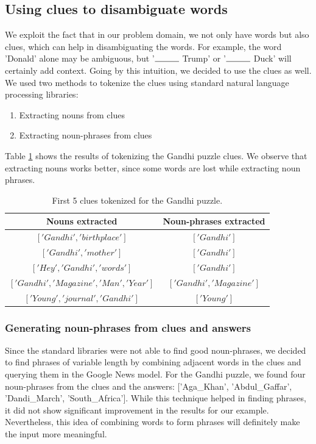 \documentclass[twoside]{article}
\begin{document}
\subsection{Using clues to disambiguate words}
\label{sec:sec3.3}
We exploit the fact that in our problem domain, we not only have words but also clues, which can help in disambiguating the words. For example, the word 'Donald' alone may be ambiguous, but '$\rule{1cm}{0.15mm}$ Trump' or '$\rule{1cm}{0.15mm}$ Duck' will certainly add context. Going by this intuition, we decided to use the clues as well. We used two methods to tokenize the clues using standard natural language processing libraries:
\begin{enumerate}
  \item Extracting nouns from clues
  \item Extracting noun-phrases from clues
\end{enumerate}
Table \ref{tab:table3} shows the results of tokenizing the Gandhi puzzle clues. We observe that extracting nouns works better, since some words are lost while extracting noun phrases. 
\begin{table}[h!]
  \begin{center}
    \begin{tabular}{c c}
      \toprule
      \textbf{Nouns extracted} & \textbf{Noun-phrases extracted}  \\ 
      \midrule
      $['Gandhi', 'birthplace']$ & $['Gandhi']$ \\
      $['Gandhi', 'mother']$ & $['Gandhi']$\\
      $['Hey', 'Gandhi', 'words']$ & $['Gandhi']$\\
      $['Gandhi', 'Magazine', 'Man', 'Year']$ & $['Gandhi', 'Magazine']$\\
      $['Young', 'journal', 'Gandhi']$ & $['Young']$\\
      \bottomrule
    \end{tabular}
    \caption{First 5 clues tokenized for the Gandhi puzzle.}
    \label{tab:table3}
  \end{center}
\end{table}
 
\subsubsection{Generating noun-phrases from clues and answers}
Since the standard libraries were not able to find good noun-phrases, we decided to find phrases of variable length by combining adjacent words in the clues and querying them in the Google News model. For the Gandhi puzzle, we found four noun-phrases from the clues and the answers: ['Aga\_Khan', 'Abdul\_Gaffar', 'Dandi\_March', 'South\_Africa']. While this technique helped in finding phrases, it did not show significant improvement in the results for our example. Nevertheless, this idea of combining words to form phrases will definitely make the input more meaningful. 
\end{document}
